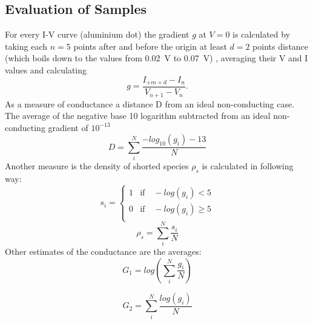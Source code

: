 \documentclass[a4paper]{article}
\begin{document}
\subsection{Evaluation of Samples}
\label{sec:eval}
For every I-V curve (aluminium dot) the gradient $g$ at $V=0$ is calculated by taking 
each $n=5$ points after and before the origin at least $d=2$ points distance (which boils
down to the values from \SI{0.02}{\volt} to \SI{0.07}{\volt}) , averaging their V and I values 
and calculating
\begin{equation}
    g = \frac{I_{+m+d} - I_n}{V_{n+1} - V_n}.
\end{equation}
As a measure of conductance a distance D from an ideal non-conducting case. The average of the negative base 10 logarithm subtracted from an ideal non-conducting gradient of $10^{-13}$ 
\begin{equation}
	D = \sum_i^N \frac{ -log_{10}(g_i) - 13}{N}
	\label{eq:D}
\end{equation}
Another measure is the density of shorted species $\rho_{s}$ is calculated in following way:
\begin{equation}
	s_i = \begin{cases}
	1 &\text{if} \quad -log(g_i) < 5 \\
	0 &\text{if} \quad -log(g_i) \geq 5 \\
	\end{cases}
\end{equation}
\begin{equation}
	\rho_s = \sum_i^N \frac{s_i}{N}
	\label{eq:rho}
\end{equation}
Other estimates of the conductance are the averages:
\begin{equation}
	G_1 = log \left( \sum_i^N \frac{g_i}{N} \right)
\end{equation}

\begin{equation}
	G_2 =  \sum_i^N \frac{log(g_i)}{N}
\end{equation}
\end{document}
